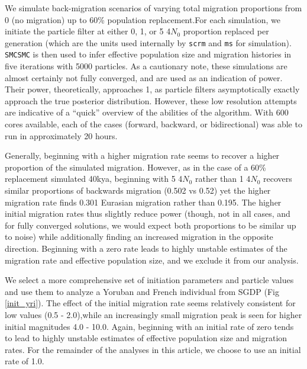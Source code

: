\documentclass{article}
\begin{document}
We simulate back-migration scenarios of varying total migration proportions from 0 (no migration) up to 60\% population replacement.For each simulation, we initiate the particle filter at either 0, 1, or 5 4$N_0$ proportion replaced per generation (which are the units used internally by {\tt scrm} and {\tt ms} for simulation).  {\tt SMCSMC} is then used to infer effective population size and migration histories in five iterations with 5000 particles. As a cautionary note, these simulations are almost certainly not fully converged, and are used as an indication of power. Their power, theoretically, approaches 1, as particle filters asymptotically exactly approach the true posterior distribution. However, these low resolution attempts are indicative of a ``quick'' overview of the abilities of the algorithm. With 600 cores available, each of the cases (forward, backward, or bidirectional) was able to run in approximately 20 hours. 

Generally, beginning with a higher migration rate seems to recover a higher proportion of the simulated migration. However, as in the case of a 60\% replacement simulated 40kya, beginning with 5 4$N_0$ rather than 1 4$N_0$ recovers similar proportions of backwards migration (0.502 vs 0.52) yet the higher migration rate finds 0.301 Eurasian migration rather than 0.195. The higher initial migration rates thus slightly reduce power (though, not in all cases, and for fully converged solutions, we would expect both proportions to be similar up to noise) while additionally finding an increased migration in the opposite direction.  Beginning with a zero rate leads to highly unstable estimates of the migration rate and effective population size, and we exclude it from our analysis.

We select a more comprehensive set of initiation parameters and particle values and use them to analyze a Yoruban and French individual from SGDP (Fig \ref{init_yri}). The effect of the initial migration rate seems relatively consistent for low values (0.5 - 2.0),while an increasingly small migration peak is seen for higher initial magnitudes 4.0 - 10.0. Again, beginning with an initial rate of zero tends to lead to highly unstable estimates of effective population size and migration rates. For the remainder of the analyses in this article, we choose to use an initial rate of 1.0. 
\end{document}
